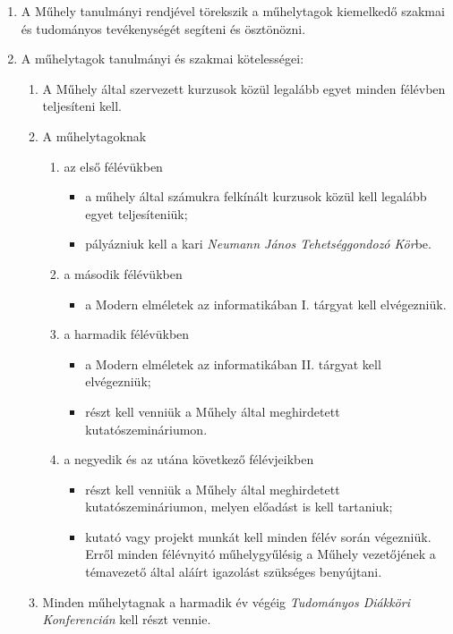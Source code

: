 \documentclass{../styles/rulebook}
\begin{document}
\begin{enumerate}
\item A Műhely tanulmányi rendjével törekszik a műhelytagok kiemelkedő szakmai és tudományos tevékenységét segíteni és ösztönözni.
\item A műhelytagok tanulmányi és szakmai kötelességei:
	\begin{enumerate}
		\item A Műhely által szervezett kurzusok közül legalább egyet minden félévben teljesíteni kell.
		\item A műhelytagoknak
			\begin{enumerate}
				\item az első félévükben 
					\begin{itemize}
						\item a műhely által számukra felkínált kurzusok közül kell legalább egyet teljesíteniük;
						\item pályázniuk kell a kari \emph{Neumann János Tehetséggondozó Kör}be.
					\end{itemize}
				\item a második félévükben
					\begin{itemize}
						\item a Modern elméletek az informatikában I. tárgyat kell elvégezniük.
					\end{itemize}
				\item a harmadik félévükben 
					\begin{itemize}
						\item a Modern elméletek az informatikában II. tárgyat kell elvégezniük;
						\item részt kell venniük a Műhely által meghirdetett kutatószemináriumon.
					\end{itemize}
				\item a negyedik és az utána következő félévjeikben 
					\begin{itemize}
						\item részt kell venniük a Műhely által meghirdetett kutatószemináriumon, melyen előadást is kell tartaniuk;
						\item kutató vagy projekt munkát kell minden félév során végezniük. Erről minden félévnyitó műhelygyűlésig a Műhely vezetőjének a témavezető által aláírt igazolást szükséges benyújtani.
					\end{itemize}
			\end{enumerate}
		\item Minden műhelytagnak a harmadik év végéig \emph{Tudományos Diákköri Konferencián} kell részt vennie.

\end{enumerate}
\end{enumerate}
\end{document}

